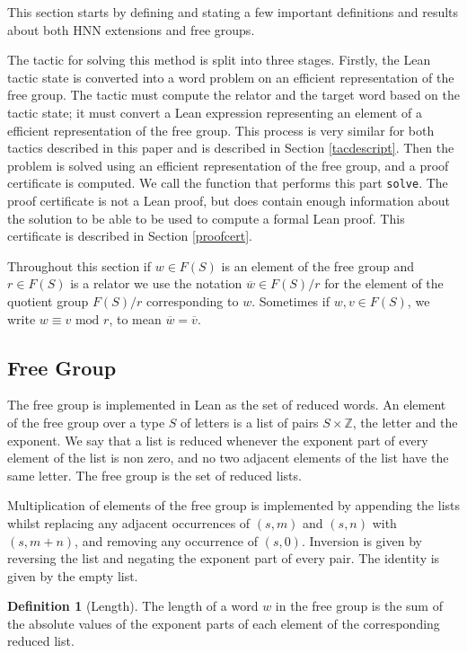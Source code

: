 \documentclass[12pt]{article} %
\theoremstyle{definition}
\theoremstyle{definition}
\theoremstyle{definition}
\theoremstyle{definition}
\newtheorem{defn}[thm]{Definition}
\begin{document}
This section starts by defining and stating a few important definitions and results about both
HNN extensions and free groups.

The tactic for solving this method is split into three stages. Firstly, the Lean tactic state
is converted into a word problem on an efficient representation of the free group. The tactic must
compute the relator and the target word based on the tactic state; it must convert a Lean
expression representing an element of a efficient representation of the free group. This process is very similar
for both tactics described in this paper and is described in Section \ref{tacdescript}. Then
the problem is solved using an efficient representation of the free group, and a proof certificate
is computed. We call the function that performs this part \lstinline{solve}.
 The proof certificate is not a Lean proof, but does contain enough information
about the solution to be able to be used to compute a formal Lean proof. This certificate is
described in Section \ref{proofcert}.

Throughout this section if $w \in F(S)$ is an element of the free group and $r \in F(S)$
is a relator we use the notation $\overline{w} \in F(S) / r$ for the element of the quotient
group $F(S) / r$ corresponding to $w$. Sometimes if $w, v \in F(S)$,
we write $w \equiv v \text{ mod } r$, to mean $\overline{w} = \overline{v}$.

\subsection{Free Group}

The free group is implemented in Lean as the set of reduced words. An element of
the free group over a type $S$ of letters is a list of pairs $S \times \mathbb{Z}$,
the letter and the exponent. We say that a list is reduced whenever
the exponent part of every element of the list is non zero, and
no two adjacent elements of the list have the same letter. The free group is the set of
reduced lists.

Multiplication of elements of the free group is implemented by appending the lists
whilst replacing any adjacent occurrences of $(s, m)$ and $(s, n)$ with $(s, m + n)$, and removing
any occurrence of $(s, 0)$. Inversion is given by reversing the list and negating
the exponent part of every pair. The identity is given by the empty list.

\begin{defn}[Length]\label{length}
  The length of a word $w$ in the free group is the sum of the absolute values of the exponent
  parts of each element of the corresponding reduced list.
\end{defn}
\end{document}
